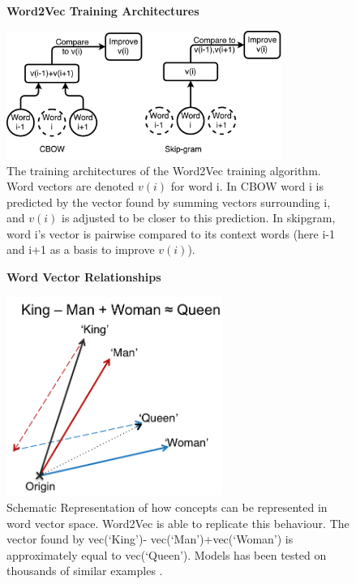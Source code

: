 \begin{figure}[H]
    \centering
    \textbf{Word2Vec Training Architectures}\par\medskip
    \includegraphics[width=0.8\textwidth]{Natural_Language_Processing/cbow_v_skip.pdf}
    \caption[Word2Vec Training Architectures ]{The training architectures of the Word2Vec training algorithm. Word vectors are denoted $v(i)$ for word i. In CBOW word i is predicted by the vector found by summing vectors surrounding i, and $v(i)$ is adjusted to be closer to this prediction. In skipgram, word i's vector is pairwise compared to its context words (here i-1 and i+1 as a basis to improve $v(i)$).}
     \label{fig:CBOWSKIP}
\end{figure}

\begin{figure}[H]
    \centering
    \textbf{Word Vector Relationships}\par\medskip
    \includegraphics[height=6.5cm]{Natural_Language_Processing/KINGQUEEN.png}
    \caption[Word Vector Relationships]{Schematic Representation of how concepts can be represented in word vector space. Word2Vec is able to replicate this behaviour. The vector found by vec(‘King’)- vec(‘Man’)+vec(‘Woman’) is approximately equal to vec(‘Queen’). Models has been tested on thousands of similar examples \cite{word2vec2}\cite{word2veckingqueen}.}
     \label{fig:KINGQUEEN}
\end{figure}




